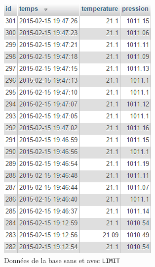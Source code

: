 \begin{figure}[!h]
\begin{minipage}{.5\linewidth}
		\includegraphics[width=.8\linewidth]{Images/Limit_BDD}
	\end{minipage}
	\cprotect\caption{Données de la base sans et avec \verb-LIMIT-}
\end{figure}